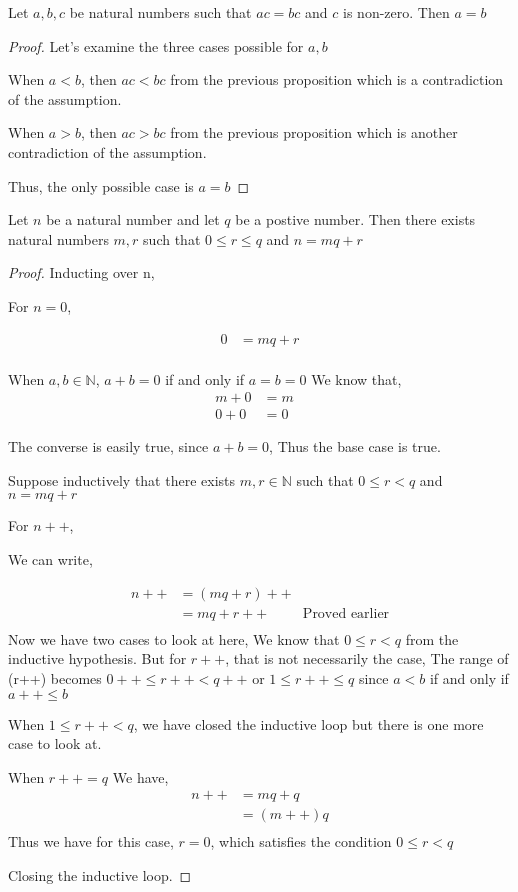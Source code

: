 \documentclass[11pt]{report}
\begin{document}
\begin{corollary}
	Let $a,b,c$ be natural numbers such that $ac = bc$ and $c$ is non-zero. Then $a = b$
\end{corollary}
\begin{proof}
	Let's examine the three cases possible for $a,b$

	When $a<b$, then $ac < bc$ from the previous proposition which is a contradiction of the assumption.

	When $a>b$, then $ac>bc$ from the previous proposition which is another contradiction of the assumption.

	Thus, the only possible case is $a = b$
\end{proof}
\begin{prop}
	Let $n$ be a natural number and let $q$ be a postive number. Then there exists natural numbers $m,r$ such that $0 \leq r \leq q$ and $n= mq + r$
\end{prop}
\begin{proof}
	Inducting over n,

	For $n=0$,

	\begin{align*}
		0 & = mq+r \\
	\end{align*}

	When $a,b \in \mathbb{N}$, $a + b = 0$ if and only if $a=b=0$
	We know that,
	\begin{align*}
		m + 0 & = m & \\
		0 + 0 & = 0
	\end{align*}

	The converse is easily true, since $a + b = 0$,
	Thus the base case is true.

	Suppose inductively that there exists $m,r \in \mathbb{N}$ such that $0 \leq r < q$ and $n=mq + r$

	For $n++$,

	We can write,

	\begin{align*}
		n++ & = (mq + r)++                         \\
		    & = mq + r++   & \text{Proved earlier} \\
	\end{align*}
	Now we have two cases to look at here,
	We know that $0 \le r < q$ from the inductive hypothesis.
	But for $r++$, that is not necessarily the case,
	The range of (r++) becomes $0++ \le r++ < q++$ or $1 \le r++ \le q$ since $a<b$ if and only if $a++ \le b$

	When $1 \le r++ < q$, we have closed the inductive loop but there is one more case to look at.

	When $r++ = q$
	We have,
	\begin{align*}
		n++ & = mq + q \\
		    & = (m++)q \\
	\end{align*}
	Thus we have for this case, $r = 0$, which satisfies the condition $0 \le r < q$

	Closing the inductive loop.
\end{proof}
\end{document}

